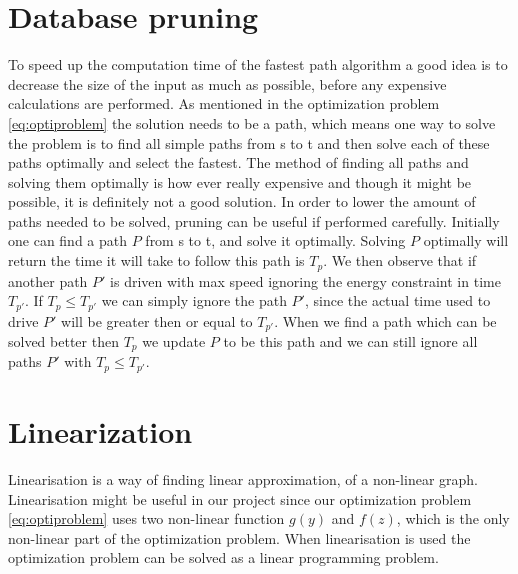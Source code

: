 \section{Database pruning}
To speed up the computation time of the fastest path algorithm a good idea is to decrease the size of the input as much as possible, before any expensive calculations are performed. As mentioned in the optimization problem \ref{eq:optiproblem} the solution needs to be a path, which means one way to solve the problem is to find all simple paths from s to t and then solve each of these paths optimally and select the fastest. The method of finding all paths and solving them optimally is how ever really expensive and though it might be possible, it is definitely not a good solution. In order to lower the amount of paths needed to be solved, pruning can be useful if performed carefully.  
Initially one can find a path $P$ from s to t, and solve it optimally. Solving 
$P$ optimally will return the time it will take to follow this path is $T_p$. We then 
observe that if another path $P'$ is driven with max speed ignoring the energy constraint in time $T_{p'}$. If $T_p \leq T_{p'}$ we can simply ignore the path $P'$, since the actual time used to drive $P'$ will be greater then or equal to $T_{p'}$.
When we find a path which can be solved better then $T_p$ we update $P$ to be this path and we can still ignore all paths $P'$ with $T_p \leq T_{p'}$. 

\section{Linearization}
Linearisation is a way of finding linear approximation, of a non-linear graph. Linearisation might be useful in our project since our optimization problem \ref{eq:optiproblem} uses two non-linear function $g(y)$ and $f(z)$, which is the only non-linear part of the optimization problem. When linearisation is used the optimization problem can be solved as a linear programming problem. 